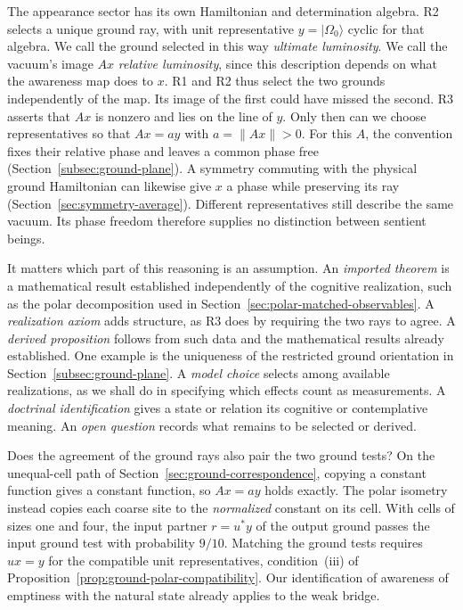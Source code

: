 \documentclass[11pt]{article}
\theoremstyle{definition}
\newcommand{\ket}[1]{\lvert #1\rangle}
\begin{document}
The appearance sector has its own Hamiltonian and determination algebra. R2 selects a unique ground ray, with unit representative $y=\ket{\Omega_0}$ cyclic for that algebra. We call the ground selected in this way \emph{ultimate luminosity}. We call the vacuum's image $Ax$ \emph{relative luminosity}, since this description depends on what the awareness map does to $x$. R1 and R2 thus select the two grounds independently of the map. Its image of the first could have missed the second. R3 asserts that $Ax$ is nonzero and lies on the line of $y$. Only then can we choose representatives so that $Ax=ay$ with $a=\|Ax\|>0$. For this $A$, the convention fixes their relative phase and leaves a common phase free (Section~\ref{subsec:ground-plane}). A symmetry commuting with the physical ground Hamiltonian can likewise give $x$ a phase while preserving its ray (Section~\ref{sec:symmetry-average}). Different representatives still describe the same vacuum. Its phase freedom therefore supplies no distinction between sentient beings.

It matters which part of this reasoning is an assumption. An \emph{imported theorem} is a mathematical result established independently of the cognitive realization, such as the polar decomposition used in Section~\ref{sec:polar-matched-observables}. A \emph{realization axiom} adds structure, as R3 does by requiring the two rays to agree. A \emph{derived proposition} follows from such data and the mathematical results already established. One example is the uniqueness of the restricted ground orientation in Section~\ref{subsec:ground-plane}. A \emph{model choice} selects among available realizations, as we shall do in specifying which effects count as measurements. A \emph{doctrinal identification} gives a state or relation its cognitive or contemplative meaning. An \emph{open question} records what remains to be selected or derived.

Does the agreement of the ground rays also pair the two ground tests? On the unequal-cell path of Section~\ref{sec:ground-correspondence}, copying a constant function gives a constant function, so $Ax=ay$ holds exactly. The polar isometry instead copies each coarse site to the \emph{normalized} constant on its cell. With cells of sizes one and four, the input partner $r=u^*y$ of the output ground passes the input ground test with probability $9/10$. Matching the ground tests requires $ux=y$ for the compatible unit representatives, condition~(iii) of Proposition~\ref{prop:ground-polar-compatibility}. Our identification of awareness of emptiness with the natural state already applies to the weak bridge.
\end{document}

